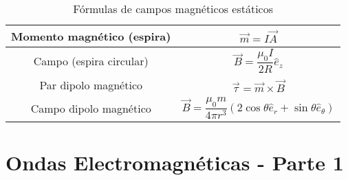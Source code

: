 \documentclass[10pt,conference]{IEEEtran}
\numberwithin{table}{section}
\begin{document}
\begin{table}[H]
{\begin{tabular}{|c|c|}
            Momento magnético (espira)  & $\vec{m} = I \vec{A}$                                                                         \\
            \hline
            Campo (espira circular)     & $\vec{B} = \dfrac{\mu_0 I}{2 R} \hat{e}_z$                                                    \\
            \hline
            Par dipolo magnético        & $\vec{\tau} = \vec{m} \times \vec{B}$                                                         \\
            \hline
            Campo dipolo magnético      & $\vec{B} = \dfrac{\mu_0 m}{4 \pi r^3} (2 \cos \theta \hat{e}_r + \sin \theta \hat{e}_\theta)$ \\
            \hline
        \end{tabular}
    }
    \caption{Fórmulas de campos magnéticos estáticos}
\end{table}

\section{Ondas Electromagnéticas - Parte 1}
\begin{table}[H]
    \centering
    \renewcommand{\arraystretch}{1.2}
    \caption{Fórmulas básicas de ondas electromagnéticas}
\end{table}
\end{document}

